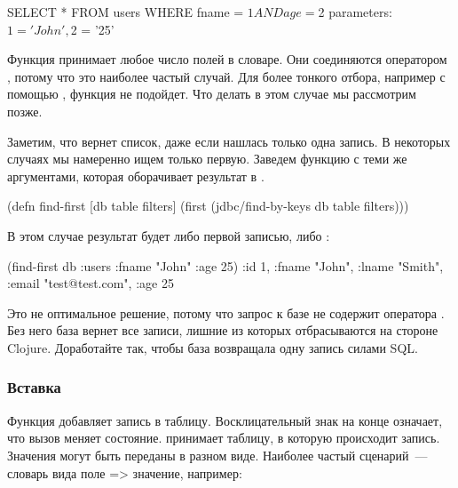 \begin{english}
  \begin{sql}
SELECT * FROM users WHERE fname = $1 AND age = $2
parameters: $1 = 'John', $2 = '25'
  \end{sql}
\end{english}

Функция принимает любое число полей в словаре. Они соединяются оператором , потому что это наиболее частый случай. Для более тонкого отбора, например с помощью , функция не подойдет. Что делать в этом случае мы рассмотрим позже.

Заметим, что  вернет список, даже если нашлась только одна запись. В некоторых случаях мы намеренно ищем только первую. Заведем функцию  с теми же аргументами, которая оборачивает результат в .

\begin{english}
  \begin{clojure}
(defn find-first [db table filters]
  (first (jdbc/find-by-keys db table filters)))
  \end{clojure}
\end{english}

В этом случае результат будет либо первой записью, либо :

\begin{english}
  \begin{clojure}
(find-first db :users {:fname "John" :age 25})
{:id 1, :fname "John", :lname "Smith", :email "test@test.com", :age 25}
  \end{clojure}
\end{english}

Это не оптимальное решение, потому что запрос к базе не содержит оператора . Без него база вернет все записи, лишние из которых отбрасываются на стороне Clojure. Доработайте  так, чтобы база возвращала одну запись силами SQL.

\subsubsection{Вставка}

Функция  добавляет запись в таблицу. Восклицательный знак на конце означает, что вызов меняет состояние.  принимает таблицу, в которую происходит запись. Значения могут быть переданы в разном виде. Наиболее частый сценарий~--- словарь вида {поле => значение}, например:

